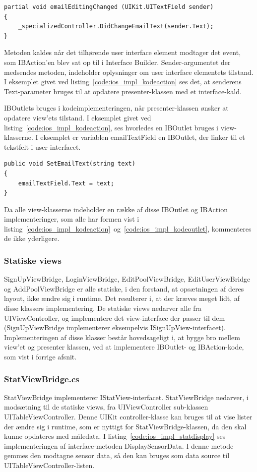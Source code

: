 \begin{lstlisting}[caption={Kodeimplementering af en IBAction},label={code:ios_impl_kodeaction}]
partial void emailEditingChanged (UIKit.UITextField sender)
{
	_specializedController.DidChangeEmailText(sender.Text);
}
\end{lstlisting}

Metoden kaldes når det tilhørende user interface element modtager det event, som IBAction'en blev sat op til i Interface Builder. Sender-argumentet der medsendes metoden, indeholder oplysninger om user interface elementets tilstand. I eksemplet givet ved listing~\ref{code:ios_impl_kodeaction} ses det, at senderens Text-parameter bruges til at opdatere presenter-klassen med et interface-kald.

IBOutlets bruges i kodeimplementeringen, når presenter-klassen ønsker at opdatere view'ets tilstand. I eksemplet givet ved listing~\ref{code:ios_impl_kodeaction}, ses hvorledes en IBOutlet bruges i view-klasserne. I eksemplet er variablen emailTextField en IBOutlet, der linker til et tekstfelt i user interfacet.

\begin{lstlisting}[caption={Brug af en IBOutlet i koden},label={code:ios_impl_kodeoutlet}]
public void SetEmailText(string text)
{
	emailTextField.Text = text;
}
\end{lstlisting}

Da alle view-klasserne indeholder en række af disse IBOutlet og IBAction implementeringer, som alle har formen vist i listing~\ref{code:ios_impl_kodeaction}~og~\ref{code:ios_impl_kodeoutlet}, kommenteres de ikke yderligere.

\subsubsection{Statiske views}
SignUpViewBridge, LoginViewBridge, EditPoolViewBridge, EditUserViewBridge og AddPoolViewBridge er alle statiske, i den forstand, at opsætningen af deres layout, ikke ændre sig i runtime. Det resulterer i, at der kræves meget lidt, af disse klassers implementering. De statiske views nedarver alle fra UIViewController, og implementere det view-interface der passer til dem (SignUpViewBridge implementerer eksempelvis ISignUpView-interfacet). Implementeringen af disse klasser består hovedsageligt i, at bygge bro mellem view'et og presenter klassen, ved at implementere IBOutlet- og IBAction-kode, som vist i forrige afsnit. 

\subsubsection{StatViewBridge.cs}
StatViewBridge implementerer IStatView-interfacet. StatViewBridge nedarver, i modsætning til de statiske views, fra UIViewController sub-klassen UITableViewController. Denne UIKit controller-klasse kan bruges til at vise lister der ændre sig i runtime, som er nyttigt for StatViewBridge-klassen, da den skal kunne opdateres med måledata. I listing~\ref{code:ios_impl_statdisplay} ses implementeringen af interface-metoden DisplaySensorData. I denne metode gemmes den modtagne sensor data, så den kan bruges som data source til UITableViewController-listen.

